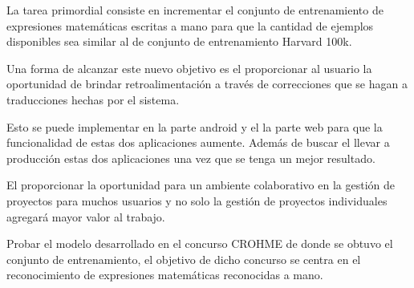 La tarea primordial consiste en incrementar el conjunto de entrenamiento de expresiones matemáticas escritas a mano para que la cantidad de ejemplos disponibles sea similar al de conjunto de entrenamiento Harvard 100k.

Una forma de alcanzar este nuevo objetivo es el proporcionar al usuario la oportunidad de brindar retroalimentación a través de correcciones que se hagan a traducciones hechas por el sistema.

Esto se puede implementar en la parte android y el la parte web para que la funcionalidad de estas dos aplicaciones aumente. Además de buscar el llevar a producción estas dos aplicaciones una vez que se tenga un mejor resultado.

El proporcionar la oportunidad para un ambiente colaborativo en la gestión de proyectos para muchos usuarios y no solo la gestión de proyectos individuales agregará mayor valor al trabajo.

Probar el modelo desarrollado en el concurso CROHME de donde se obtuvo el conjunto de entrenamiento, el objetivo de dicho concurso se centra en el reconocimiento de expresiones matemáticas reconocidas a mano.


